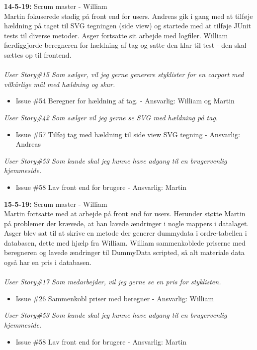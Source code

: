 \documentclass[11pt]{report}
\begin{document}
\noindent\textbf{14-5-19:} Scrum master - William\\
Martin fokuserede stadig på front end for users. Andreas gik i gang med at tilføje hældning på taget til SVG tegningen (side view) og startede med at tilføje JUnit tests til diverse metoder. Asger fortsatte sit arbejde med logfiler. William færdiggjorde beregneren for hældning af tag og satte den klar til test - den skal sættes op til frontend.\\\\
\textit{User Story\#15 Som sælger, vil jeg gerne generere styklister for en carport med vilkårlige mål med hældning og skur.}
\begin{itemize}
\renewcommand\labelitemi{--}
\item Issue \#54 Beregner for hældning af tag. - Ansvarlig: William og Martin
\end{itemize}
\textit{User Story\#42 Som sælger vil jeg gerne se SVG med hældning på tag.}
\begin{itemize}
\renewcommand\labelitemi{--}
\item Issue \#57 Tilføj tag med hældning til side view SVG tegning - Ansvarlig: Andreas
\end{itemize}
\textit{User Story\#53 Som kunde skal jeg kunne have adgang til en brugervenlig hjemmeside.}
\begin{itemize}
\renewcommand\labelitemi{--}
\item Issue \#58 Lav front end for brugere - Ansvarlig: Martin
\end{itemize}

\noindent\textbf{15-5-19:} Scrum master - William\\
Martin fortsatte med at arbejde på front end for users. Herunder støtte Martin på problemer der krævede, at han lavede ændringer i nogle mappers i datalaget.
Asger blev sat til at skrive en metode der generer dummydata i ordre-tabellen i databasen, dette med hjælp fra William. William sammenkoblede priserne med beregneren og lavede ændringer til DummyData scripted, så alt materiale data også har en pris i databasen.\\\\
\textit{User Story\#17 Som medarbejder, vil jeg gerne se en pris for styklisten.}
\begin{itemize}
\renewcommand\labelitemi{--}
\item Issue \#26 Sammenkobl priser med beregner - Ansvarlig: William
\end{itemize}
\textit{User Story\#53 Som kunde skal jeg kunne have adgang til en brugervenlig hjemmeside.}
\begin{itemize}
\renewcommand\labelitemi{--}
\item Issue \#58 Lav front end for brugere - Ansvarlig: Martin
\end{itemize}
\end{document}
